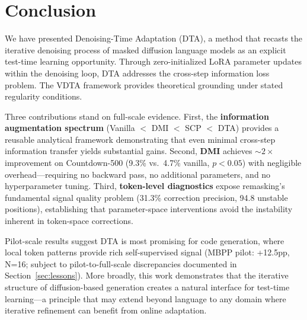 \documentclass{article}
\begin{document}
\section{Conclusion}
\label{sec:conclusion}

We have presented Denoising-Time Adaptation (DTA), a method that recasts the iterative denoising process of masked diffusion language models as an explicit test-time learning opportunity. Through zero-initialized LoRA parameter updates within the denoising loop, DTA addresses the cross-step information loss problem. The VDTA framework provides theoretical grounding under stated regularity conditions.

Three contributions stand on full-scale evidence. First, the \textbf{information augmentation spectrum} (Vanilla $<$ DMI $<$ SCP $<$ DTA) provides a reusable analytical framework demonstrating that even minimal cross-step information transfer yields substantial gains. Second, \textbf{DMI} achieves ${\sim}2{\times}$ improvement on Countdown-500 (9.3\% vs.\ 4.7\% vanilla, $p < 0.05$) with negligible overhead---requiring no backward pass, no additional parameters, and no hyperparameter tuning. Third, \textbf{token-level diagnostics} expose remasking's fundamental signal quality problem (31.3\% correction precision, 94.8 unstable positions), establishing that parameter-space interventions avoid the instability inherent in token-space corrections.

Pilot-scale results suggest DTA is most promising for code generation, where local token patterns provide rich self-supervised signal (MBPP pilot: +12.5pp, N=16; subject to pilot-to-full-scale discrepancies documented in Section~\ref{sec:lessons}). More broadly, this work demonstrates that the iterative structure of diffusion-based generation creates a natural interface for test-time learning---a principle that may extend beyond language to any domain where iterative refinement can benefit from online adaptation.

\end{document}
